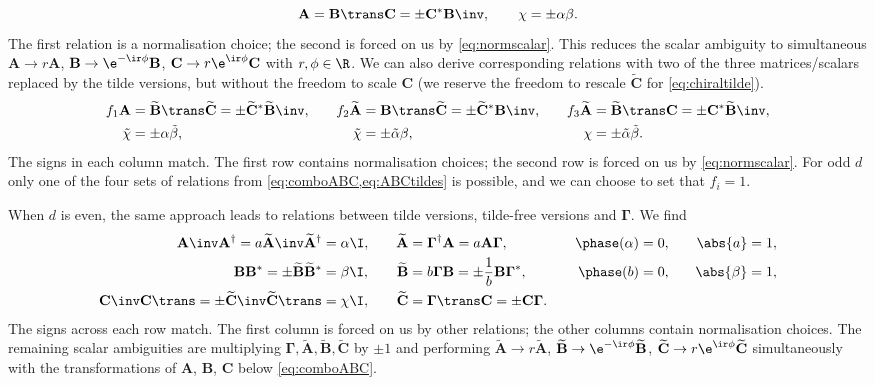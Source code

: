 \documentclass[11pt]{article}
\newcommand{\Gammab}{\boldsymbol{\Gamma}}
\newcommand{\A}{\mathbf{A}}
\newcommand{\B}{\mathbf{B}}
\renewcommand{\C}{\mathbf{C}}
\newcommand{\At}{\widetilde{\mathbf{A}}}
\newcommand{\Bt}{\widetilde{\mathbf{B}}}
\newcommand{\Ct}{\widetilde{\mathbf{C}}}
\newcommand{\alphat}{\tilde{\alpha}}
\newcommand{\betat}{\tilde{\beta}}
\newcommand{\chit}{\tilde{\chi}}
\begin{document}
%
\begin{equation}\label{eq:comboABC}
  \A = \B\trans \C = \pm \C^\ast \B\inv, \qquad
  \chi = \pm \alpha \beta.
\end{equation}
%
The first relation is a normalisation choice; the second is forced on us by \cref{eq:normscalar}.
This reduces the scalar ambiguity to simultaneous \( \A \rightarrow r \A \),
\( \B \rightarrow \e^{-\ir\phi} \B \), \( \C \rightarrow r\e^{\ir\phi} \C \)
with \( r, \phi \in \R \).
We can also derive corresponding relations with two of the three matrices/scalars replaced by the tilde versions, but without the freedom to scale $\C$ (we reserve the freedom to rescale $\Ct$ for \cref{eq:chiraltilde}).
%
\begin{equation}\label{eq:ABCtildes}
\begin{aligned}
  f_1 \A &= \Bt\trans \Ct = \pm \Ct^\ast \Bt\inv, &\quad
  f_2 \At &= \B\trans \Ct = \pm \Ct^\ast \B\inv, &\quad
  f_3 \At &= \Bt\trans \C = \pm \C^\ast \Bt\inv, \\
  {\chit} &= \pm {\alpha} {\betat}, &
  {\chit} &= \pm {\alphat} {\beta}, &
  {\chi} &= \pm {\alphat} {\betat}.
\end{aligned}
\end{equation}
%
The signs in each column match.
The first row contains normalisation choices; the second row is forced on us by \cref{eq:normscalar}.
For odd $d$ only one of the four sets of relations from \cref{eq:comboABC,eq:ABCtildes} is possible, and we can choose to set that $f_i = 1$.

When $d$ is even, the same approach leads to relations between tilde versions, tilde-free versions and $\Gammab$.
We find
%
\begin{equation}\label{eq:chiraltilde}
\begin{aligned}
  \A\inv \A^\dag = a \At\inv \At^\dag &= \alpha \I, &\quad
  \At &= \Gammab^\dag \A = a \A \Gammab,            &\quad
  \phase(\alpha) &= 0,                              &\quad
  \abs{a} &= 1, \\
  \B \B^\ast = \pm \Bt \Bt^\ast &= \beta \I,             &
  \Bt &= b \Gammab \B = \pm \frac{1}{b} \B \Gammab^\ast, &
  \phase(b) &= 0,                                        &
  \abs{\beta} &= 1, \\
  \C\inv \C\trans = \pm \Ct\inv \Ct\trans &= \chi \I,    &
  \Ct &= \Gammab\trans \C = \pm \C \Gammab.              &
\end{aligned}
\end{equation}
%
The signs across each row match.
The first column is forced on us by other relations; the other columns contain normalisation choices.
The remaining scalar ambiguities are multiplying $\Gammab,\At,\Bt,\Ct$ by $\pm1$
and performing \( \At \rightarrow r \At \), \( \Bt \rightarrow \e^{-\ir\phi} \Bt \),
\( \Ct \rightarrow r\e^{\ir\phi} \Ct \) simultaneously with the transformations of $\A$, $\B$, $\C$ below \cref{eq:comboABC}.
\end{document}
